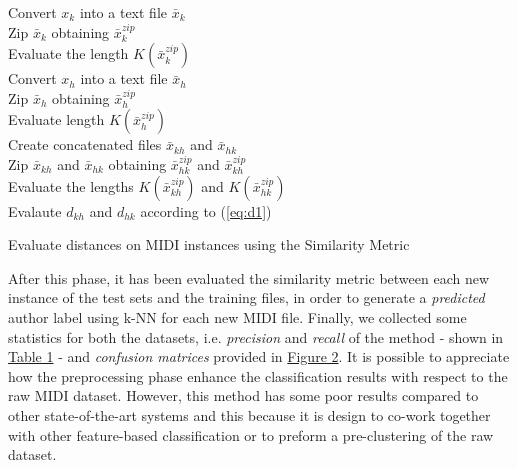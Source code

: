 \documentclass[a4paper]{article}
\begin{document}
	\begin{algorithm}[!h]
		{
			Convert $x_k$ into a text file $\bar{x}_k$\\
			Zip $\bar{x}_k$ obtaining $\bar{x}_k^{zip}$\\
			Evaluate the length $K\left(\bar{x}_k^{zip}\right)$\\
			{
				Convert $x_h$ into a text file $\bar{x}_h$\\
				Zip $\bar{x}_h$ obtaining $\bar{x}_h^{zip}$\\
				Evaluate length $K\left(\bar{x}_h^{zip}\right)$\\
				
				\vspace{5px}
				Create concatenated files $\bar{x}_{kh}$ and $\bar{x}_{hk}$\\
				Zip $\bar{x}_{kh}$ and $\bar{x}_{hk}$ obtaining $\bar{x}_{hk}^{zip}$ and $\bar{x}_{kh}^{zip}$\\
				Evaluate the lengths $K\left(\bar{x}_{kh}^{zip}\right)$ and $K\left(\bar{x}_{hk}^{zip}\right)$\\
				\vspace{5px}
				Evalaute $d_{kh}$ and $d_{hk}$ according to (\ref{eq:d1})}}

		\vspace{10px}
		\label{alg_1}
		\caption{Evaluate distances on MIDI instances using the Similarity Metric}
	\end{algorithm}
	
	After this phase, it has been evaluated the similarity metric between each new instance of the test sets and the training files, in order to generate a \textit{predicted} author label using k-NN for each new MIDI file. Finally, we collected some statistics for both the datasets, i.e. \textit{precision} and \textit{recall} of the method - shown in \hyperref[tab:stats]{Table 1} - and \textit{confusion matrices} provided in \hyperref[fig:cm]{Figure 2}. It is possible to appreciate how the preprocessing phase enhance the classification results with respect to the raw MIDI dataset. However, this method has some poor results compared to other state-of-the-art systems and this because it is design to co-work together with other feature-based classification or to preform a pre-clustering of the raw dataset.
	
\end{document}
